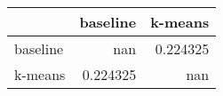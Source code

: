 \begin{tabular}{lrr}
\toprule
          &   baseline &    k-means \\
\midrule
 baseline & nan        &   0.224325 \\
 k-means  &   0.224325 & nan        \\
\bottomrule
\end{tabular}